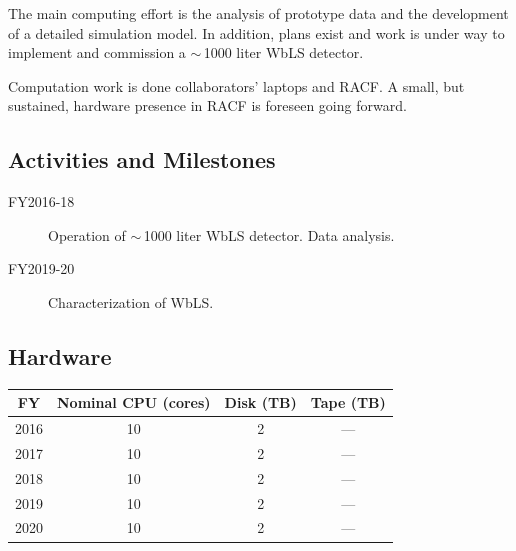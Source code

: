 \documentclass[pdftex,12pt,letter]{article}
\begin{document}
The main computing effort is the analysis of prototype data and the development of a detailed
simulation model. In addition, plans exist and work is under way to implement and commission a 
$\sim$\,1000 liter WbLS detector.

Computation work is done collaborators' laptops and RACF. A small, but sustained, hardware
presence in RACF is foreseen going forward.

\subsection{Activities and Milestones}

\begin{description}

\item[FY2016-18] Operation of $\sim$\,1000 liter WbLS detector. Data analysis.
                \item [FY2019-20] Characterization of WbLS. 
\end{description}

\subsection{Hardware}
\begin{table}[tbh]
\centering
\begin{tabular}{|c|c|c|c|}
\hline
FY & Nominal CPU (cores) & Disk (TB) & Tape (TB) \\
\hline
2016 &  10  & 2 & --- \\
\hline
2017 &  10 & 2  & ---  \\
\hline
2018 &  10 & 2  & --- \\
\hline
2019  & 10 & 2 & ---  \\
\hline
2020 &  10  & 2 & --- \\
\hline
\end{tabular}
\end{table}
\end{document}
